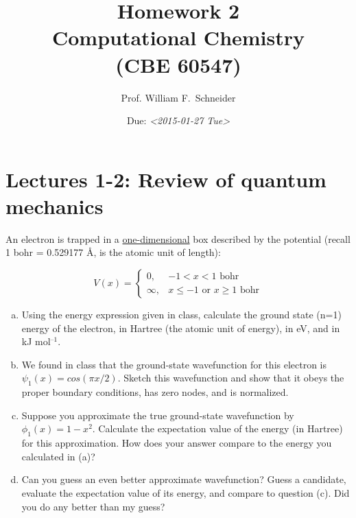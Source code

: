 \documentclass[11pt]{article}
\date{Due: \textit{<2015-01-27 Tue>}}
\title{}
\begin{document}
\title{Homework 2\\Computational Chemistry\\(CBE 60547)}
\author{Prof. William F.\ Schneider}
\maketitle


\section{Lectures 1-2: Review of quantum mechanics}
\label{sec-1}

An electron is trapped in a \uline{one-dimensional} box described by the potential (recall 1 bohr = 0.529177 Å, is the atomic unit of length):

\begin{center}
\begin{equation}
    V(x)= 
\begin{cases}
    0, & -1  < x < 1  \text{ bohr} \\
    \infty, & x \leq -1 \text{ or } x \geq 1  \text{ bohr}
\end{cases}
\end{equation}
\end{center}

\begin{enumerate}[(a)]
\item Using the energy expression given in class, calculate the ground state (n=1) energy of the electron, in Hartree (the atomic unit of energy), in eV, and in kJ mol$^{\text{–1}}$.

\item We found in class that the ground-state wavefunction for this electron is $\psi_{1}(x) = cos (\pi x/2)$. Sketch this wavefunction and show that it obeys the proper boundary conditions, has zero nodes, and is normalized.

\item Suppose you approximate the true ground-state wavefunction by $\phi_{1}(x) = 1 - x^{2}$. Calculate the expectation value of the energy (in Hartree) for this approximation. How does your answer compare to the energy you calculated in (a)?

\item Can you guess an even better approximate wavefunction? Guess a candidate, evaluate the expectation value of its energy, and compare to question (c). Did you do any better than my guess?
\end{enumerate}
\end{document}
